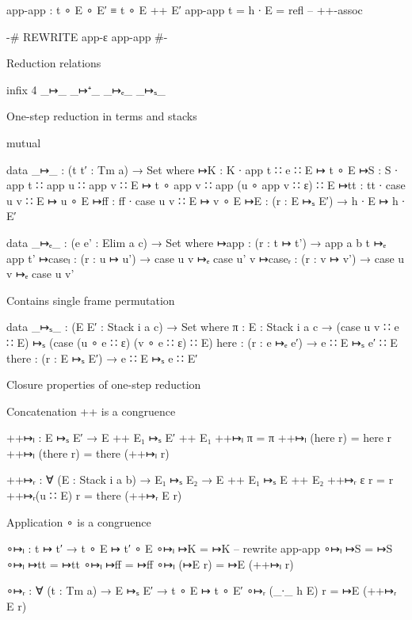 \begin{code}
app-app : t ∘ E ∘ E′ ≡ t ∘ E ++ E′
app-app {t = h ∙ E} = refl  -- ++-assoc

{-# REWRITE app-ε app-app #-}
\end{code}


Reduction relations

\begin{code}
infix 4 _↦_ _↦⁺_ _↦ₑ_ _↦ₛ_
\end{code}

One-step reduction in terms and stacks

\begin{code}
mutual

  data _↦_ : (t t′ : Tm a) → Set where
    ↦K   : K   ∙ app t ∷ e              ∷ E ↦ t  ∘ E
    ↦S   : S   ∙ app t ∷ app u ∷ app v  ∷ E ↦ t  ∘ app v ∷ app (u ∘ app v ∷ ε) ∷ E
    ↦tt  : tt  ∙ case u v               ∷ E ↦ u  ∘ E
    ↦ff  : ff  ∙ case u v               ∷ E ↦ v  ∘ E
    ↦E   : (r : E ↦ₛ E′) → h ∙ E ↦ h ∙ E′

  data _↦ₑ_ : (e e' : Elim a c) → Set where
    ↦app    : (r : t ↦ t')  → app {a} {b} t  ↦ₑ app t'
    ↦caseₗ  : (r : u ↦ u')  → case u v       ↦ₑ case u' v
    ↦caseᵣ  : (r : v ↦ v')  → case u v       ↦ₑ case u v'
\end{code}

  Contains single frame permutation

\begin{code}
  data _↦ₛ_ : (E E′ : Stack i a c) → Set where
    π      : {E : Stack i a c} → (case u v ∷ e ∷ E) ↦ₛ (case (u ∘ e ∷ ε) (v ∘ e ∷ ε) ∷ E)
    here   : (r : e ↦ₑ e′)     → e ∷ E              ↦ₛ e′ ∷ E
    there  : (r : E ↦ₛ E′)     → e ∷ E              ↦ₛ e  ∷ E′
\end{code}

Closure properties of one-step reduction

Concatenation ++ is a congruence

\begin{code}
++↦ₗ  :  E ↦ₛ E′
     →  E ++ E₁ ↦ₛ E′ ++ E₁
++↦ₗ π          = π
++↦ₗ (here  r)  = here r
++↦ₗ (there r)  = there (++↦ₗ r)

++↦ᵣ  :  ∀ (E : Stack i a b)
      →  E₁ ↦ₛ E₂
      →  E ++ E₁ ↦ₛ E ++ E₂
++↦ᵣ ε       r = r
++↦ᵣ(u ∷ E)  r = there (++↦ᵣ E r)
\end{code}

Application ∘ is a congruence

\begin{code}
∘↦ₗ  :  t ↦ t′
    →  t ∘ E ↦ t′ ∘ E
∘↦ₗ ↦K      = ↦K  -- rewrite app-app
∘↦ₗ ↦S      = ↦S
∘↦ₗ ↦tt     = ↦tt
∘↦ₗ ↦ff     = ↦ff
∘↦ₗ (↦E r)  = ↦E (++↦ₗ r)

∘↦ᵣ  :  ∀ (t : Tm a)
     →  E ↦ₛ E′
     →  t ∘ E ↦ t ∘ E′
∘↦ᵣ (_∙_ h E) r = ↦E (++↦ᵣ E r)
\end{code}

